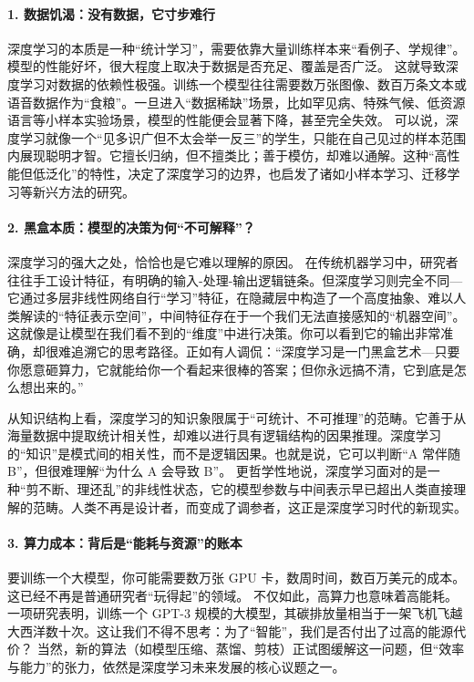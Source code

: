 \paragraph*{1. 数据饥渴：没有数据，它寸步难行}
深度学习的本质是一种“统计学习”，需要依靠大量训练样本来“看例子、学规律”。模型的性能好坏，很大程度上取决于数据是否充足、覆盖是否广泛。
这就导致深度学习对数据的依赖性极强。训练一个模型往往需要数万张图像、数百万条文本或语音数据作为“食粮”。一旦进入“数据稀缺”场景，比如罕见病、特殊气候、低资源语言等小样本实验场景，模型的性能便会显著下降，甚至完全失效。
可以说，深度学习就像一个“见多识广但不太会举一反三”的学生，只能在自己见过的样本范围内展现聪明才智。它擅长归纳，但不擅类比；善于模仿，却难以通解。这种“高性能但低泛化”的特性，决定了深度学习的边界，也启发了诸如小样本学习、迁移学习等新兴方法的研究。
\paragraph*{2. 黑盒本质：模型的决策为何“不可解释”？}
深度学习的强大之处，恰恰也是它难以理解的原因。
在传统机器学习中，研究者往往手工设计特征，有明确的输入-处理-输出逻辑链条。但深度学习则完全不同---它通过多层非线性网络自行“学习”特征，在隐藏层中构造了一个高度抽象、难以人类解读的“特征表示空间”，中间特征存在于一个我们无法直接感知的“机器空间”。
这就像是让模型在我们看不到的“维度”中进行决策。你可以看到它的输出非常准确，却很难追溯它的思考路径。正如有人调侃：“深度学习是一门黑盒艺术---只要你愿意砸算力，它就能给你一个看起来很棒的答案；但你永远搞不清，它到底是怎么想出来的。”


从知识结构上看，深度学习的知识象限属于“可统计、不可推理”的范畴。它善于从海量数据中提取统计相关性，却难以进行具有逻辑结构的因果推理。深度学习的“知识”是模式间的相关性，而不是逻辑因果。也就是说，它可以判断“A 常伴随 B”，但很难理解“为什么 A 会导致 B”。
更哲学性地说，深度学习面对的是一种“剪不断、理还乱”的非线性状态，它的模型参数与中间表示早已超出人类直接理解的范畴。人类不再是设计者，而变成了调参者，这正是深度学习时代的新现实。
\paragraph*{3. 算力成本：背后是“能耗与资源”的账本}
要训练一个大模型，你可能需要数万张 GPU 卡，数周时间，数百万美元的成本。这已经不再是普通研究者“玩得起”的领域。
不仅如此，高算力也意味着高能耗。一项研究表明，训练一个 GPT-3 规模的大模型，其碳排放量相当于一架飞机飞越大西洋数十次。这让我们不得不思考：为了“智能”，我们是否付出了过高的能源代价？
当然，新的算法（如模型压缩、蒸馏、剪枝）正试图缓解这一问题，但“效率与能力”的张力，依然是深度学习未来发展的核心议题之一。
